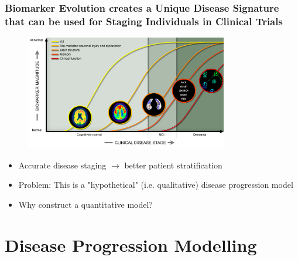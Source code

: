 \documentclass[8pt,xcolor=table,aspectratio=169]{beamer}
\begin{document}
\begin{frame}
\frametitle{Biomarker Evolution creates a Unique Disease Signature\\
that can be used for Staging Individuals in Clinical Trials}

\begin{figure}
\centering 
\vspace{-1em}
\includegraphics[height=5cm]{adniDiseaseProgression}

\end{figure}


\begin{itemize}
 \item Accurate disease staging $\rightarrow$ better patient stratification
 \item Problem: This is a "hypothetical" (i.e. qualitative) disease progression model
 \item Why construct a quantitative model? 
\end{itemize}

\end{frame}


\section{Disease Progression Modelling}

% 
% 
% 
\end{document}
